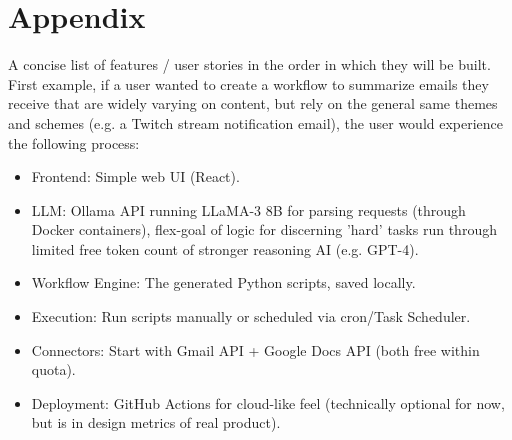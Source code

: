 \documentclass[12pt]{article}
\begin{document}
\newpage
\section*{Appendix}
A concise list of features / user stories in the order in which they will be built.
First example, if a user wanted to create a workflow to summarize emails they receive that are widely varying on content, but rely on the general same themes and schemes (e.g. a Twitch stream notification email), the user would experience the following process:
\begin{itemize}
	\item Frontend: Simple web UI (React).
	\item LLM: Ollama API running LLaMA-3 8B for parsing requests (through Docker containers), flex-goal of logic for discerning 'hard' tasks run through limited free token count of stronger reasoning AI (e.g. GPT-4).
	\item Workflow Engine: The generated Python scripts, saved locally.
	\item Execution: Run scripts manually or scheduled via cron/Task Scheduler.
	\item Connectors: Start with Gmail API + Google Docs API (both free within quota).
	\item Deployment: GitHub Actions for cloud-like feel (technically optional for now, but is in design metrics of real product).
\end{itemize}




\end{document}
